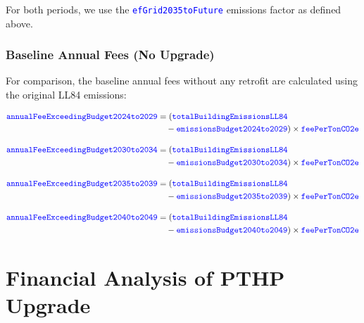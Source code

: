 \documentclass{article}
\newcommand{\code}[1]{\textcolor{blue}{\texttt{#1}}}
\begin{document}
For both periods, we use the \code{efGrid2035toFuture} emissions factor as defined above.

\subsubsection{Baseline Annual Fees (No Upgrade)}

For comparison, the baseline annual fees without any retrofit are calculated using the original LL84 emissions:

\begin{align}
\code{annualFeeExceedingBudget2024to2029} &= (\code{totalBuildingEmissionsLL84} \nonumber\\
&\quad - \code{emissionsBudget2024to2029}) \times \code{feePerTonCO2e}
\end{align}

\begin{align}
\code{annualFeeExceedingBudget2030to2034} &= (\code{totalBuildingEmissionsLL84} \nonumber\\
&\quad - \code{emissionsBudget2030to2034}) \times \code{feePerTonCO2e}
\end{align}

\begin{align}
\code{annualFeeExceedingBudget2035to2039} &= (\code{totalBuildingEmissionsLL84} \nonumber\\
&\quad - \code{emissionsBudget2035to2039}) \times \code{feePerTonCO2e}
\end{align}

\begin{align}
\code{annualFeeExceedingBudget2040to2049} &= (\code{totalBuildingEmissionsLL84} \nonumber\\
&\quad - \code{emissionsBudget2040to2049}) \times \code{feePerTonCO2e}
\end{align}


\section{Financial Analysis of PTHP Upgrade}

\vspace{0.3cm}
\noindent{}
\vspace{0.3cm}
\end{document}
